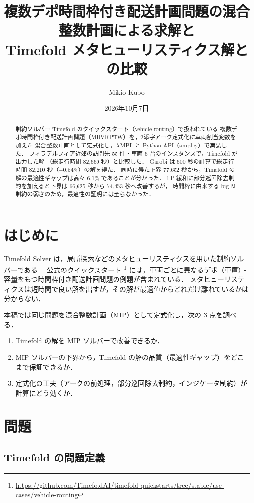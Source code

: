 \documentclass[11pt,a4paper]{ltjsarticle}
\title{複数デポ時間枠付き配送計画問題の混合整数計画による求解と\\
Timefold メタヒューリスティクス解との比較}
\author{Mikio Kubo}
\date{2026年10月7日}
\begin{document}
\maketitle

\begin{abstract}
制約ソルバー Timefold のクイックスタート（vehicle-routing）で扱われている
複数デポ時間枠付き配送計画問題（MDVRPTW）を，2添字アーク定式化に車両割当変数を加えた
混合整数計画として定式化し，AMPL と Python API（amplpy）で実装した．
フィラデルフィア近郊の訪問先 55 件・車両 6 台のインスタンスで，Timefold が出力した解
（総走行時間 82,660 秒）と比較した．
Gurobi は 600 秒の計算で総走行時間 82,210 秒（$-0.54\%$）の解を得た．
同時に得た下界 77,652 秒から，Timefold の解の最適性ギャップは高々 6.1\% であることが分かった．
LP 緩和に部分巡回除去制約を加えると下界は 66,625 秒から 74,453 秒へ改善するが，
時間枠に由来する big-M 制約の弱さのため，最適性の証明には至らなかった．
\end{abstract}

\section{はじめに}

Timefold Solver は，局所探索などのメタヒューリスティクスを用いた制約ソルバーである．
公式のクイックスタート
\footnote{\url{https://github.com/TimefoldAI/timefold-quickstarts/tree/stable/use-cases/vehicle-routing}}
には，車両ごとに異なるデポ（車庫）・容量をもつ時間枠付き配送計画問題の例題が含まれている．
メタヒューリスティクスは短時間で良い解を出すが，その解が最適値からどれだけ離れているかは分からない．

本稿では同じ問題を混合整数計画（MIP）として定式化し，次の 3 点を調べる．
\begin{enumerate}
  \item Timefold の解を MIP ソルバーで改善できるか．
  \item MIP ソルバーの下界から，Timefold の解の品質（最適性ギャップ）をどこまで保証できるか．
  \item 定式化の工夫（アークの前処理，部分巡回除去制約，インジケータ制約）が計算にどう効くか．
\end{enumerate}

\section{問題}

\subsection{Timefold の問題定義}
\end{document}
